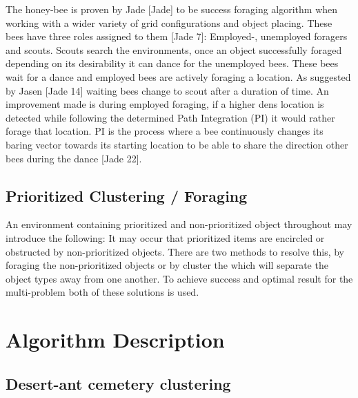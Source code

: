 \documentclass[12pt]{article}
\begin{document}
\par{The honey-bee is proven by Jade [Jade] to be success foraging algorithm when working with a wider variety of grid configurations and object placing. These bees have three roles assigned to them [Jade 7]: Employed-, unemployed foragers and scouts. Scouts search the environments, once an object successfully foraged depending on its desirability it can dance for the unemployed bees. These bees wait for a dance and employed bees are actively foraging a location. As suggested by Jasen [Jade 14] waiting bees change to scout after a duration of time. An improvement made is during employed foraging, if a higher dens location is detected while following the determined Path Integration (PI) it would rather forage that  location. PI is the process where a bee continuously changes its baring vector towards its starting location to be able to share the direction other bees during the dance [Jade 22].}

\subsection{Prioritized Clustering / Foraging}

\par{An environment containing prioritized and non-prioritized object throughout may introduce the following: It may occur that prioritized items are encircled or obstructed by non-prioritized objects. There are two methods to resolve this, by foraging the non-prioritized objects or by cluster the which will separate the object types away from one another. To achieve success and optimal result for the multi-problem both of these solutions is used.}

\section{Algorithm Description}

\subsection{Desert-ant cemetery clustering}
\end{document}

